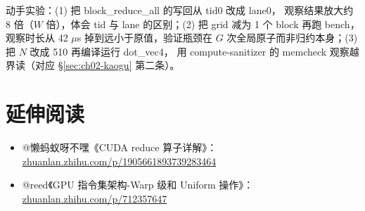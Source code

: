 动手实验：(1) 把 block\_reduce\_all 的写回从 tid0 改成 lane0，
观察结果放大约 8 倍（$W$ 倍），体会 tid 与 lane 的区别；(2) 把 grid 减为 1 个
block 再跑 bench，观察时长从 42 $\mu$s 掉到远小于原值，验证瓶颈在
$G$ 次全局原子而非归约本身；(3) 把 $N$ 改成 510 再编译运行 dot\_vec4，
用 compute-sanitizer 的 memcheck 观察越界读（对应
\S\ref{sec:ch02-kaogu} 第二条）。

\section*{延伸阅读}
\begin{itemize}
\item @懒蚂蚁呀不嘿《CUDA reduce 算子详解》：
  \href{https://zhuanlan.zhihu.com/p/1905661893739283464}{zhuanlan.zhihu.com/p/1905661893739283464}
\item @reed《GPU 指令集架构-Warp 级和 Uniform 操作》：
  \href{https://zhuanlan.zhihu.com/p/712357647}{zhuanlan.zhihu.com/p/712357647}
\end{itemize}
